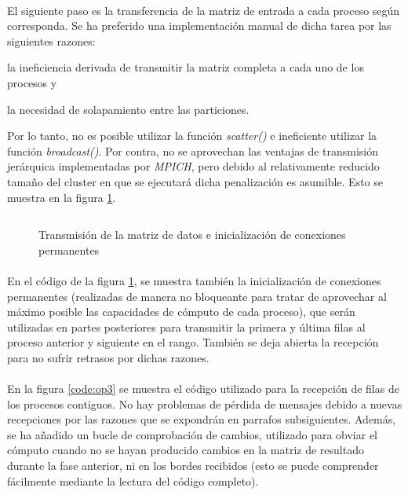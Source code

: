 \documentclass[10pt, a4paper,spanish]{article}
\begin{document}
		\paragraph{}
		El siguiente paso es la transferencia de la matriz de entrada a cada proceso según corresponda. Se ha preferido una implementación manual de dicha tarea por las siguientes razones: \begin {enumerate*} [label=\itshape\alph*\upshape)]
					\item la ineficiencia derivada de transmitir la matriz completa a cada uno de los procesos y
					\item la necesidad de solapamiento entre las particiones.
		\end {enumerate*} Por lo tanto, no es posible utilizar la función \emph{scatter()} e ineficiente utilizar la función \emph{broadcast()}. Por contra, no se aprovechan las ventajas de transmisión jerárquica implementadas por \emph{MPICH}, pero debido al relativamente reducido tamaño del cluster en que se ejecutará dicha penalización es asumible. Esto se muestra en la figura \ref{code:op2}.

		\begin{figure}[h]
			\centering
			\inputminted{c}{./code/op2.c}
			\caption{Transmisión de la matriz de datos e inicialización de conexiones permanentes}
			\label{code:op2}
		\end{figure}

		\paragraph{}
		En el código de la figura \ref{code:op2}, se muestra también la inicialización de conexiones permanentes (realizadas de manera no bloqueante para tratar de aprovechar al máximo posible las capacidades de cómputo de cada proceso), que serán utilizadas en partes posteriores para transmitir la primera y última filas al proceso anterior y siguiente en el rango. También se deja abierta la recepción para no sufrir retrasos por dichas razones.

		\paragraph{}
		En la figura \ref{code:op3} se muestra el código utilizado para la recepción de filas de los procesos contiguos. No hay problemas de pérdida de mensajes debido a nuevas recepciones por las razones que se expondrán en parrafos subsiguientes. Además, se ha añadido un bucle de comprobación de cambios, utilizado para obviar el cómputo cuando no se hayan producido cambios en la matriz de resultado durante la fase anterior, ni en los bordes recibidos (esto se puede comprender fácilmente mediante la lectura del código completo).
\end{document}
